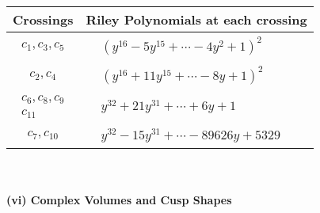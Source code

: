 \documentclass[1p]{elsarticle_modified}
\theoremstyle{definition}
\begin{document}
\begin{tabular}{m{50pt}|m{274pt}}
Crossings & \hspace{64pt}Riley Polynomials at each crossing \\
\hline $$\begin{aligned}c_{1},c_{3},c_{5}\end{aligned}$$&$\begin{aligned}
&(y^{16}-5 y^{15}+\cdots-4 y^2+1)^{2}
\end{aligned}$\\
\hline $$\begin{aligned}c_{2},c_{4}\end{aligned}$$&$\begin{aligned}
&(y^{16}+11 y^{15}+\cdots-8 y+1)^{2}
\end{aligned}$\\
\hline $$\begin{aligned}c_{6},c_{8},c_{9}\\c_{11}\end{aligned}$$&$\begin{aligned}
&y^{32}+21 y^{31}+\cdots+6 y+1
\end{aligned}$\\
\hline $$\begin{aligned}c_{7},c_{10}\end{aligned}$$&$\begin{aligned}
&y^{32}-15 y^{31}+\cdots-89626 y+5329
\end{aligned}$\\
\hline
\end{tabular}\\~\\
\newpage\flushleft \textbf{(vi) Complex Volumes and Cusp Shapes}
\end{document}
